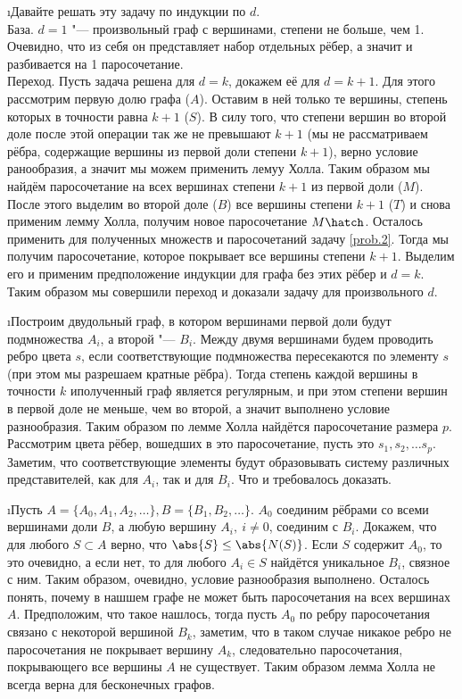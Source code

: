 \i Давайте решать эту задачу по индукции по $d$.\\
База. $d = 1$ "--- произвольный граф с вершинами, степени не больше, чем 1. Очевидно, что из себя он представляет набор отдельных рёбер, а значит и разбивается на 1 паросочетание.\\
Переход. Пусть задача решена для $d = k$, докажем её для $d = k+1$. Для этого рассмотрим первую долю графа ($A$). Оставим в ней только те вершины, степень которых в точности равна $k+1$ ($S$). В силу того, что степени вершин во второй доле после этой операции так же не превышают $k+1$ (мы не рассматриваем рёбра, содержащие вершины из первой доли степени $k+1$), верно условие ранообразия, а значит мы можем применить лемуу Холла. Таким образом мы найдём паросочетание на всех вершинах степени $k+1$ из первой доли ($M$). После этого выделим во второй доле ($B$) все вершины степени $k+1$ ($T$) и снова применим лемму Холла, получим новое паросочетание $M\hatch$. Осталось применить для полученных множеств и паросочетаний задачу \ref{prob.2}. Тогда мы получим паросочетание, которое покрывает все вершины степени $k+1$. Выделим его и применим предположение индукции для графа без этих рёбер и $d=k$. Таким образом мы совершили переход и доказали задачу для произвольного $d$.

\i Построим двудольный граф, в котором вершинами первой доли будут подмножества $A_i$, а второй "--- $B_i$. Между двумя вершинами будем проводить ребро цвета $s$, если соответствующие подмножества пересекаются по элементу $s$ (при этом мы разрешаем кратные рёбра). Тогда степень каждой вершины в точности $k$ иполученный граф является регулярным, и при этом степени вершин в первой доле не меньше, чем во второй, а значит выполнено условие разнообразия. Таким образом по лемме Холла найдётся паросочетание размера $p$. Рассмотрим цвета рёбер, вошедших в это паросочетание, пусть это $s_1, s_2, \ldots s_p$. Заметим, что соответствующие элементы будут образовывать систему различных представителей, как для $A_i$, так и для $B_i$. Что и требовалось доказать.

\i Пусть $A = \{A_0, A_1, A_2, \ldots\}, B = \{B_1, B_2, \ldots\}$. $A_0$ соединим рёбрами со всеми вершинами доли $B$, а любую вершину $A_i, \ i \ne 0$, соединим с $B_i$. Докажем, что для любого $S \subset A$ верно, что $\abs{S} \leq \abs{N(S)}$. Если $S$ содержит $A_0$, то это очевидно, а если нет, то для любого $A_i \in S$ найдётся уникальное $B_i$, связное с ним. Таким образом, очевидно, условие разнообразия выполнено. Осталось понять, почему в нашшем графе не может быть паросочетания на всех вершинах $A$. Предположим, что такое нашлось, тогда пусть $A_0$ по ребру паросочетания связано с некоторой вершиной $B_k$, заметим, что в таком случае никакое ребро не паросочетания не покрывает вершину $A_k$, следовательно паросочетания, покрывающего все вершины $A$ не существует. Таким образом лемма Холла не всегда верна для бесконечных графов.